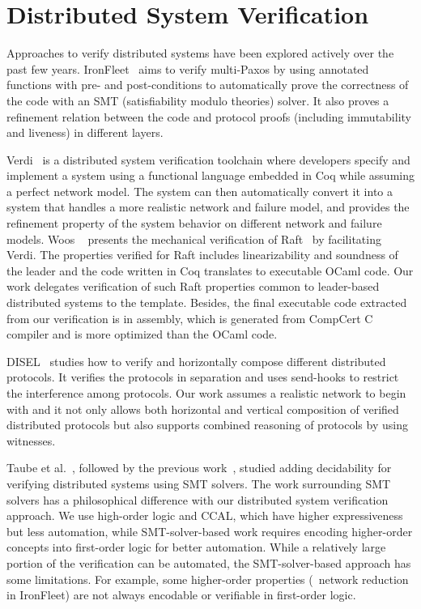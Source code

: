 \section{Distributed System Verification}
\label{chatper:related:sec:distributed-system-verification}

Approaches to verify distributed systems have been explored actively over the
past few years. 
IronFleet~\cite{ironfleet} aims to verify multi-Paxos by using annotated functions with pre- and
post-conditions to automatically prove the correctness of the code with an SMT (satisfiability
modulo theories) solver.
It also proves a refinement relation between the code and
protocol proofs (including immutability and liveness) in different layers. 

Verdi~\cite{verdi} is a distributed system verification toolchain
where developers specify and implement a system using a functional language
embedded in Coq while assuming a perfect network model. 
The system can then automatically convert
it into a system that handles a more realistic network and failure model,
and provides the refinement property of the system behavior on different network and failure models.
Woos \etal~ presents the mechanical verification of Raft~\cite{cppraft} by facilitating Verdi. The properties
verified for Raft includes linearizability and soundness of the leader and
the code written in Coq translates to executable OCaml code. 
Our work delegates verification of such Raft properties common to leader-based distributed systems to the template.
Besides, the final executable code extracted from
our verification is in assembly, which is generated from CompCert C compiler and is more
optimized than the OCaml code.


DISEL~\cite{disel}
studies how to verify and horizontally compose different distributed protocols.
It verifies the protocols in separation and uses send-hooks to restrict the
interference among protocols. Our work assumes a realistic network to begin with
and it not only allows both horizontal and vertical composition of verified distributed
protocols but also supports combined reasoning of protocols by using witnesses.

Taube et al.~\cite{modular}, followed by the previous work~\cite{paxosepr}, studied adding
decidability for verifying distributed systems using SMT solvers.
The work surrounding SMT solvers has a philosophical difference with our distributed system verification approach.
We use high-order logic and CCAL, which have higher expressiveness but less automation,
while SMT-solver-based work requires encoding higher-order concepts into
first-order logic for better automation. While a relatively large portion of the
verification can be automated, the SMT-solver-based approach has some limitations.
For example, some higher-order properties (\eg~network reduction
in IronFleet) are not always encodable or verifiable in first-order logic.


